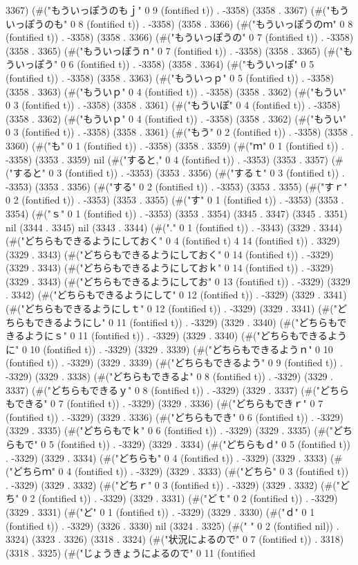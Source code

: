 3367) (#("もういっぽうのもｊ" 0 9 (fontified t)) . -3358) (3358 . 3367) (#("もういっぽうのも" 0 8 (fontified t)) . -3358) (3358 . 3366) (#("もういっぽうのｍ" 0 8 (fontified t)) . -3358) (3358 . 3366) (#("もういっぽうの" 0 7 (fontified t)) . -3358) (3358 . 3365) (#("もういっぽうｎ" 0 7 (fontified t)) . -3358) (3358 . 3365) (#("もういっぽう" 0 6 (fontified t)) . -3358) (3358 . 3364) (#("もういっぽ" 0 5 (fontified t)) . -3358) (3358 . 3363) (#("もういっｐ" 0 5 (fontified t)) . -3358) (3358 . 3363) (#("もういｐ" 0 4 (fontified t)) . -3358) (3358 . 3362) (#("もうい" 0 3 (fontified t)) . -3358) (3358 . 3361) (#("もういぽ" 0 4 (fontified t)) . -3358) (3358 . 3362) (#("もういｐ" 0 4 (fontified t)) . -3358) (3358 . 3362) (#("もうい" 0 3 (fontified t)) . -3358) (3358 . 3361) (#("もう" 0 2 (fontified t)) . -3358) (3358 . 3360) (#("も" 0 1 (fontified t)) . -3358) (3358 . 3359) (#("ｍ" 0 1 (fontified t)) . -3358) (3353 . 3359) nil (#("すると," 0 4 (fontified t)) . -3353) (3353 . 3357) (#("すると" 0 3 (fontified t)) . -3353) (3353 . 3356) (#("するｔ" 0 3 (fontified t)) . -3353) (3353 . 3356) (#("する" 0 2 (fontified t)) . -3353) (3353 . 3355) (#("すｒ" 0 2 (fontified t)) . -3353) (3353 . 3355) (#("す" 0 1 (fontified t)) . -3353) (3353 . 3354) (#("ｓ" 0 1 (fontified t)) . -3353) (3353 . 3354) (3345 . 3347) (3345 . 3351) nil (3344 . 3345) nil (3343 . 3344) (#("." 0 1 (fontified t)) . -3343) (3329 . 3344) (#("どちらもできるようにしておく" 0 4 (fontified t) 4 14 (fontified t)) . 3329) (3329 . 3343) (#("どちらもできるようにしておく" 0 14 (fontified t)) . -3329) (3329 . 3343) (#("どちらもできるようにしておｋ" 0 14 (fontified t)) . -3329) (3329 . 3343) (#("どちらもできるようにしてお" 0 13 (fontified t)) . -3329) (3329 . 3342) (#("どちらもできるようにして" 0 12 (fontified t)) . -3329) (3329 . 3341) (#("どちらもできるようにしｔ" 0 12 (fontified t)) . -3329) (3329 . 3341) (#("どちらもできるようにし" 0 11 (fontified t)) . -3329) (3329 . 3340) (#("どちらもできるようにｓ" 0 11 (fontified t)) . -3329) (3329 . 3340) (#("どちらもできるように" 0 10 (fontified t)) . -3329) (3329 . 3339) (#("どちらもできるようｎ" 0 10 (fontified t)) . -3329) (3329 . 3339) (#("どちらもできるよう" 0 9 (fontified t)) . -3329) (3329 . 3338) (#("どちらもできるよ" 0 8 (fontified t)) . -3329) (3329 . 3337) (#("どちらもできるｙ" 0 8 (fontified t)) . -3329) (3329 . 3337) (#("どちらもできる" 0 7 (fontified t)) . -3329) (3329 . 3336) (#("どちらもできｒ" 0 7 (fontified t)) . -3329) (3329 . 3336) (#("どちらもでき" 0 6 (fontified t)) . -3329) (3329 . 3335) (#("どちらもでｋ" 0 6 (fontified t)) . -3329) (3329 . 3335) (#("どちらもで" 0 5 (fontified t)) . -3329) (3329 . 3334) (#("どちらもｄ" 0 5 (fontified t)) . -3329) (3329 . 3334) (#("どちらも" 0 4 (fontified t)) . -3329) (3329 . 3333) (#("どちらｍ" 0 4 (fontified t)) . -3329) (3329 . 3333) (#("どちら" 0 3 (fontified t)) . -3329) (3329 . 3332) (#("どちｒ" 0 3 (fontified t)) . -3329) (3329 . 3332) (#("どち" 0 2 (fontified t)) . -3329) (3329 . 3331) (#("どｔ" 0 2 (fontified t)) . -3329) (3329 . 3331) (#("ど" 0 1 (fontified t)) . -3329) (3329 . 3330) (#("ｄ" 0 1 (fontified t)) . -3329) (3326 . 3330) nil (3324 . 3325) (#("  " 0 2 (fontified nil)) . 3324) (3323 . 3326) (3318 . 3324) (#("状況によるので" 0 7 (fontified t)) . 3318) (3318 . 3325) (#("じょうきょうによるので" 0 11 (fontified 